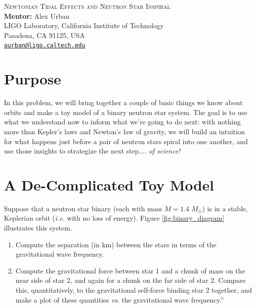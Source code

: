 \documentclass[11pt]{article}
\begin{document}
\begin{center}
{\Large\textsc{Newtonian Tidal Effects and Neutron Star Inspiral}} \\
\vspace{10pt}
{\large \textbf{Mentor:} Alex Urban} \\
{\small LIGO Laboratory, California Institute of Technology \\
Pasadena, CA 91125, USA \\
\href{mailto:aurban@ligo.caltech.edu}{\texttt{aurban@ligo.caltech.edu}}}
\end{center}

\section*{Purpose}

\hspace{15pt} In this problem, we will bring together a couple of basic things we know about orbits and make a toy model of a binary neutron star system. The goal is to use what we understand now to inform what we're going to do next: with nothing more than Kepler's laws and Newton's law of gravity, we will build an intuition for what happens just before a pair of neutron stars spiral into one another, and use those insights to strategize the next step.... \textit{of science!}

\section*{A De-Complicated Toy Model}
\hspace{15pt} Suppose that a neutron star binary (each with mass $M = 1.4\,\, M_{\odot}$) is in a stable, Keplerian orbit (\textit{i.e.} with no loss of energy). Figure \ref{fig:binary_diagram} illustrates this system.

\begin{enumerate}
\item Compute the separation (in km) between the stars in terms of the gravitational wave frequency.

\item Compute the gravitational force between star 1 and a chunk of mass on the near side of star 2, and again for a chunk on the far side of star 2. Compare this, quantitatively, to the gravitational self-force binding star 2 together, and make a plot of these quantities \textit{vs}. the gravitational wave frequency.”
\end{enumerate}
\end{document}
